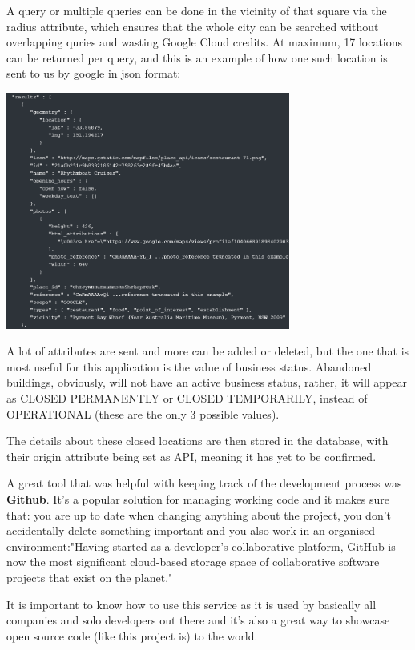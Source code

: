 \documentclass[12pt,a4paper]{report}
\begin{document}
A query or multiple queries can be done in the vicinity of that square via the radius attribute, which ensures that the whole city can be searched without overlapping quries and wasting Google Cloud credits. At maximum, 17 locations can be returned per query, and this is an example of how one such location is sent to us by google in json format:

\begin{center}
\includegraphics[width=0.7\textwidth]{images/json.png}
\end{center}

A lot of attributes are sent and more can be added or deleted, but the one that is most useful for this application is the value of business status. Abandoned buildings, obviously, will not have an active business status, rather, it will appear as CLOSED PERMANENTLY or CLOSED TEMPORARILY, instead of OPERATIONAL (these are the only 3 possible values).

The details about these closed locations are then stored in the database, with their origin attribute being set as API, meaning it has yet to be confirmed.

A great tool that was helpful with keeping track of the development process was \textbf{Github}. It's a popular solution for managing working code and it makes sure that: you are up to date when changing anything about the project, you don't accidentally delete something important and you also work in an organised environment:"Having started as a developer's collaborative platform, GitHub is now the most significant cloud-based storage space of collaborative software projects that exist on the planet."~\cite{gitHub}

It is important to know how to use this service as it is used by basically all companies and solo developers out there and it's also a great way to showcase open source code (like this project is) to the world.
\end{document}
